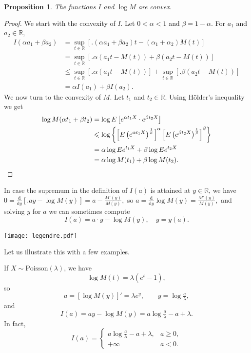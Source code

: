 \documentclass[12pt]{article}
\newtheorem{proposition}[equation]{Proposition}
\theoremstyle{definition}
\newcommand{\dd}{\mathrm{d}}
\newcommand{\E}{\mathbb{E}}
\newcommand{\R}{\mathbb{R}}
\renewcommand{\geq}{\geqslant}
\renewcommand{\le}{\leqslant}
\renewcommand{\t}{t}
\renewcommand{\E}{E}
\begin{document}

\begin{proposition}
\label{prop:convex}
The functions $I$ and $\log M$ are convex.
\end{proposition}
\begin{proof}
We start with the convexity of $I$.
Let $0 < \alpha < 1$ and $\beta=1-\alpha$.
For $a_1$ and $a_2 \in \R$,
\begin{align*}
I(\alpha a_1 + \beta a_2)
& =
\sup_{\t\in\R}
\left[ \big. (\alpha a_1 + \beta a_2)\t - (\alpha_1+\alpha_2) M(\t) \right]
\\
& =
\sup_{\t\in\R}
\left[ \big. \alpha (a_1 \t - M(\t)) + \beta (a_2 \t - M(\t)) \right]
\\
& \le
\sup_{\t\in\R}
\left[ \big. \alpha (a_1 \t - M(\t)) \right]
+
\sup_{\t\in\R}
\left[ \big. \beta (a_2 \t - M(\t)) \right]
\\
& =
\alpha I(a_1)
+
\beta I(a_2)
.
\end{align*}
We now turn to the convexity of $M$. Let $\t_1$ and $\t_2 \in \R$.
Using Hölder's inequality we get
\begin{align*}
\log M( \alpha \t_1 + \beta \t_2 )
& =
\log \E \left[ e^{\alpha \t_1 X} \cdot e^{\beta \t_2 X} \right]
\\
& \le
\log
\left\{
\left[ \E \left( e^{\alpha \t_1 X} \right)^{\frac{1}{\alpha}} \right]^\alpha
\left[ \E \left( e^{\beta  \t_2 X} \right)^{\frac{1}{\beta }} \right]^\beta
\right\}
\\
& =
\alpha \log \E e^{\t_1 X}
+
\beta  \log \E e^{\t_2 X}
\\
& =
\alpha \log M(\t_1) + \beta \log M(\t_2 )
.
\qedhere
\end{align*}
\end{proof}

In case the supremum in the definition of $I(a)$ is attained at $y\in\R$, we have
\(
0 = 
\tfrac{\dd}{\dd y}\left[ \big. a y - \log M(y) \right]
=
a - \frac{M'(y)}{M(y)}
,
\)
so
\(
a = \tfrac{\dd}{\dd y} \log M(y) = \tfrac{M'(y)}{M(y)},
\)
and solving $y$ for $a$ we can sometimes compute
\[
I(a) = a \cdot y - \log M(y), \quad y=y(a)
.
\]
{\centering\texttt{[image: legendre.pdf]}\par}

Let us illustrate this with a few examples.

If $X\sim\mathrm{Poisson}(\lambda)$, we have
\[
\log M(t)=\lambda(e^t-1)
,
\]
so
\[
a = [\log M(y)]' = \lambda e^y,
\qquad
y = \log \tfrac{a}{\lambda}
,
\]
and
\[
I(a) = ay - \log M(y) = a \log \tfrac{a}{\lambda} - a + \lambda
.
\]
In fact,
\[
I(a) =
\begin{cases}
a \log \tfrac{a}{\lambda} - a + \lambda ,& a \geq 0, \\
+\infty & a<0.
\end{cases}
\]
\end{document}
